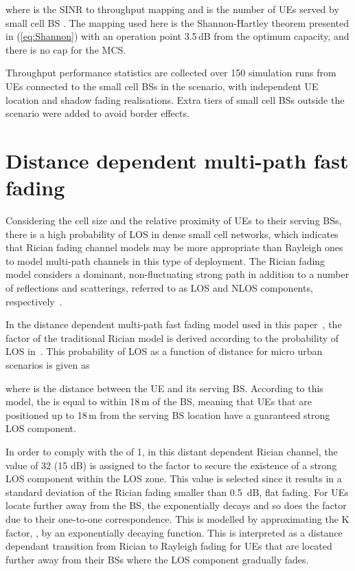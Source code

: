 \documentclass{IEEEtran}
\begin{document}
where  is the SINR to throughput mapping and  is the number of \acp{UE} served by small cell \ac{BS} .
The mapping used here is the Shannon-Hartley theorem presented in (\ref{eq:Shannon}) with an operation point 3.5\,dB from the optimum capacity,
and there is no cap for the \ac{MCS}.


Throughput performance statistics are collected over 150 simulation runs from \acp{UE} connected to the small cell \acp{BS} in the scenario,
with independent \ac{UE} location and shadow fading realisations.
Extra tiers of small cell BSs outside the scenario were added to avoid border effects.

\section{Distance dependent multi-path fast fading}
\label{sec:appendix2}

Considering the cell size and the relative proximity of \acp{UE} to their serving \acp{BS},
there is a high probability of \ac{LOS} in dense small cell networks,
which indicates that Rician fading channel models may be more appropriate than Rayleigh ones to model multi-path channels in this type of deployment.
The Rician fading model considers a dominant, non-fluctuating strong path in addition to a number of reflections and scatterings,
referred to as \ac{LOS} and \ac{NLOS} components, respectively~\cite{HetNetbook}.

In the distance dependent multi-path fast fading model used in this paper~\cite{2015Jafari},
the  factor of the traditional Rician model is derived according to the probability of \ac{LOS} in~\cite{TR36.814}.
This probability of \ac{LOS} as a function of distance for micro urban scenarios is given as

where  is the distance between the \ac{UE} and its serving \ac{BS}.
According to this model,
the  is equal to  within 18\,m of the \ac{BS},
meaning that \acp{UE} that are positioned up to 18\,m from the serving \ac{BS} location have a guaranteed strong \ac{LOS} component.

In order to comply with the  of 1,
in this distant dependent Rician channel,
the value of 32 (15 dB) is assigned to the  factor to secure the existence of a strong \ac{LOS} component within the \ac{LOS} zone.
This value is selected since it results  in a standard deviation of the Rician fading  smaller than 0.5~dB, flat fading.
For \acp{UE} locate further away from the \ac{BS},
the  exponentially decays and so does the  factor due to their one-to-one correspondence.
This is modelled by approximating the K factor,
,
by an exponentially decaying function.
This is interpreted as a distance dependant transition from Rician to Rayleigh fading for \acp{UE} that are located further away from their \acp{BS}
where the \ac{LOS} component gradually fades.
\end{document}
